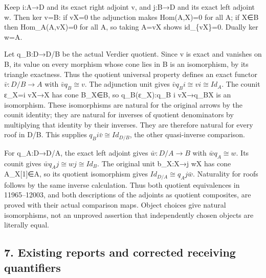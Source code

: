 \documentclass[11pt]{article}
\begin{document}
Keep i:\allowbreak{}A\allowbreak{}→D and its exact right adjoint v,\allowbreak{} and j:\allowbreak{}B\allowbreak{}→D and its exact left adjoint w. Then ker v\allowbreak{}=B:\allowbreak{} if vX\allowbreak{}=0 the adjunction makes Hom(A,\allowbreak{}X)\allowbreak{}\allowbreak{}=0 for all A; if X\allowbreak{}∈B then Hom\_\allowbreak{}A(A,\allowbreak{}vX)\allowbreak{}\allowbreak{}=0 for all A,\allowbreak{} so taking A\allowbreak{}=vX shows id\_\allowbreak{}\{vX\}\allowbreak{}=0. Dually ker w\allowbreak{}=A.

Let q\_\allowbreak{}B:\allowbreak{}D\allowbreak{}→D/\allowbreak{}B be the actual Verdier quotient. Since v is exact and vanishes on B,\allowbreak{} its value on every morphism whose cone lies in B is an isomorphism,\allowbreak{} by its triangle exactness. Thus the quotient universal property defines an exact functor \(\bar v:D/B\to A\) with \(\bar v q_B\cong v\). The adjunction unit gives \(\bar v q_B i\cong v i\cong Id_A\). The counit ε\_\allowbreak{}X\allowbreak{}=i vX\allowbreak{}→X has cone B\_\allowbreak{}X\allowbreak{}∈B,\allowbreak{} so q\_\allowbreak{}B(ε\_\allowbreak{}X)\allowbreak{}:\allowbreak{}q\_\allowbreak{}B i vX\allowbreak{}→q\_\allowbreak{}BX is an isomorphism. These isomorphisms are natural for the original arrows by the counit identity; they are natural for inverses of quotient denominators by multiplying that identity by their inverses. They are therefore natural for every roof in D/\allowbreak{}B. This supplies \(q_B i\bar v\cong Id_{D/B}\),\allowbreak{} the other quasi-inverse comparison.

For q\_\allowbreak{}A:\allowbreak{}D\allowbreak{}→D/\allowbreak{}A,\allowbreak{} the exact left adjoint gives \(\bar w:D/A\to B\) with \(\bar w q_A\cong w\). Its counit gives \(\bar w q_A j\cong wj\cong Id_B\). The original unit b\_\allowbreak{}X:\allowbreak{}X\allowbreak{}→j wX has cone A\_\allowbreak{}X[1]\allowbreak{}\allowbreak{}∈A,\allowbreak{} so its quotient isomorphism gives \(Id_{D/A}\cong q_A j\bar w\). Naturality for roofs follows by the same inverse calculation. Thus both quotient equivalences in 11965–\allowbreak{}12003,\allowbreak{} and both descriptions of the adjoints as quotient composites,\allowbreak{} are proved with their actual comparison maps. Object choices give natural isomorphisms,\allowbreak{} not an unproved assertion that independently chosen objects are literally equal.

\subsection{7. Existing reports and corrected receiving quantifiers}\label{proofs-11665-12003-existing-reports-and-corrected-receiving-quantifiers}
\end{document}
